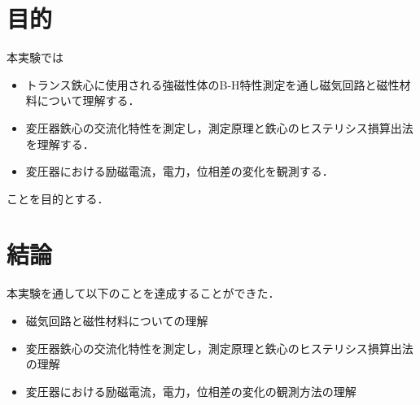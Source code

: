 \documentclass[11pt,dvipdfmx]{ujarticle}
\begin{document}
\begin{jikkenTitle}
\end{jikkenTitle}

\section{目的}
本実験では
\begin{itemize}
	\item トランス鉄心に使用される強磁性体のB-H特性測定を通し磁気回路と磁性材料について理解する．
	\item 変圧器鉄心の交流化特性を測定し，測定原理と鉄心のヒステリシス損算出法を理解する．
	\item 変圧器における励磁電流，電力，位相差の変化を観測する．
\end{itemize}
ことを目的とする．






\clearpage
\section{結論}
本実験を通して以下のことを達成することができた．
\begin{itemize}
	\item 磁気回路と磁性材料についての理解
	\item 変圧器鉄心の交流化特性を測定し，測定原理と鉄心のヒステリシス損算出法の理解
	\item 変圧器における励磁電流，電力，位相差の変化の観測方法の理解
\end{itemize}
\newpage
\printbibliography[title=参考文献]
\end{document}

